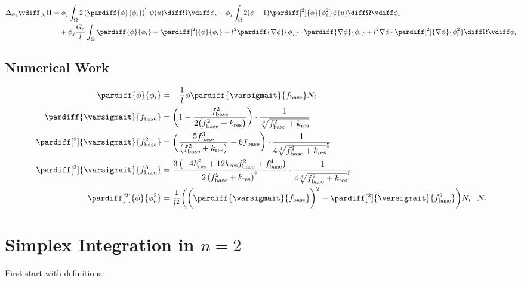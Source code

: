 \documentclass{mitschrift}
\begin{document}
\begin{align}
    \Delta_{\phi_j} \vdiff_{\phi_i} \Pi &= \phi_j \int_\Omega 2\left(\pardiff{\phi}{\phi_i}\right)^2 \psi(u) \diff \Omega \vdiff \phi_i 
    + \phi_j \int_\Omega 2(\phi -1 )\pardiff[^2]{\phi}{\phi_i^2} \psi(u) \diff \Omega \vdiff \phi_i \\
&\phantom{={}} +\phi_j \frac{G_c}{l} \int_\Omega \pardiff{\phi}{\phi_i} + \pardiff[^2]{\phi}{\phi_i} + l^2 \pardiff{\nabla \phi}{\phi_j} \cdot \pardiff{\nabla \phi}{\phi_i} + l^2 \nabla \phi \cdot \pardiff[^2]{\nabla \phi}{\phi_i^2} \diff \Omega \vdiff \phi_i
\end{align}

\subsection{Numerical Work}

\begin{align} %
    \pardiff{\phi}{\phi_i} &= - \frac{1}{l}\phi \pardiff{\varsigmait}{f_{\text{base}}} N_i \\
    \pardiff{\varsigmait}{f_{\text{base}}} &= \biggl(1 - \frac{f_{\text{base}}^2}{2\bigl(f_{\text{base}}^2 + k_{\text{res}}\bigr)}\biggr) \cdot \frac{1}{\sqrt[4]{f_{\text{base}}^2 + k_{\text{res}}}}\\
    \pardiff[^2]{\varsigmait}{f_{\text{base}}^2} &= \biggl(\frac{5f_{\text{base}}^3}{\bigl(f_{\text{base}}^2 + k_{\text{res}}\bigr)} - 6 f_{\text{base}}\biggr) \cdot \frac{1}{4 {\sqrt[4]{f_{\text{base}}^2 + k_{\text{res}}}}^5}\\
    \pardiff[^3]{\varsigmait}{f_{\text{base}}^3}&= \frac{3\left(-4k_{\text{res}}^{2}+12k_{\text{res}}f_{\text{base}}^{2}+f_{\text{base}}^{4}\right)}{2\left(f_{\text{base}}^{2}+k_{\text{res}}\right)^{2}}\cdot\frac{1}{4{\sqrt[4]{f_{\text{base}}^2 + k_{\text{res}}}}^5}\\
    \pardiff[^2]{\phi}{\phi_i^2} &= \frac{1}{l^2} \biggl( \biggl(\pardiff{\varsigmait}{f_{\text{base}}}\biggr)^2 - \pardiff[^2]{\varsigmait}{f_{\text{base}}^2} \biggr) N_i \cdot N_i
\end{align}



\pagebreak

\section{Simplex Integration in $n=2$}


First start with definitions:
\end{document}
